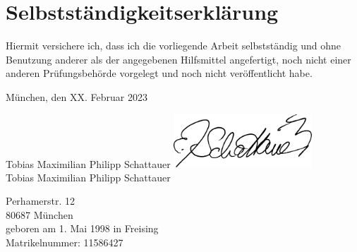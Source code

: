 \chapter*{Selbstständigkeitserklärung}
Hiermit versichere ich, dass ich die vorliegende Arbeit selbstständig und ohne Benutzung anderer als der angegebenen Hilfsmittel angefertigt, noch nicht einer anderen Prüfungsbehörde vorgelegt und noch nicht veröffentlicht habe.

\vspace{5cm}
München, den XX. Februar 2023

\ifprintversion
    \vspace{3cm}
    Tobias Maximilian Philipp Schattauer
\else
    \vspace{1cm}
    \includegraphics[height=2cm]{img/full_a4.png}\\
    Tobias Maximilian Philipp Schattauer
\fi

\ifprintversion
Perhamerstr. 12 \\
80687 München \\
geboren am 1. Mai 1998 in Freising \\
Matrikelnummer: 11586427
\fi